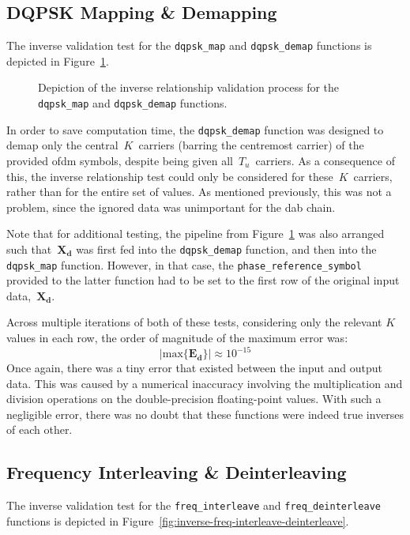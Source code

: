 \documentclass[class=report,11pt,crop=false]{standalone}
\begin{document}
\subsection{DQPSK Mapping \& Demapping}
The inverse validation test for the \texttt{dqpsk\_map} and \texttt{dqpsk\_demap} functions is depicted in Figure~\ref{fig:inverse-dqpsk-map-demap}.

\begin{figure}[htbp]
  \centering
  \captionsetup{type=figure}
  \def\svgwidth{0.95\linewidth}
  { %
      }
  \caption{Depiction of the inverse relationship validation process for the \texttt{dqpsk\_map} and \texttt{dqpsk\_demap} functions.}
  \label{fig:inverse-dqpsk-map-demap}
\end{figure}

In order to save computation time, the \texttt{dqpsk\_demap} function was designed to demap only the central~\(K\)~carriers (barring the centremost carrier) of the provided \gls{ofdm} symbols, despite being given all~\(T_u\)~carriers. As a consequence of this, the inverse relationship test could only be considered for these~\(K\)~carriers, rather than for the entire set of values. As mentioned previously, this was not a problem, since the ignored data was unimportant for the \gls{dab} chain.

Note that for additional testing, the pipeline from Figure~\ref{fig:inverse-dqpsk-map-demap} was also arranged such that~\(\mathbf{X_d}\) was first fed into the \texttt{dqpsk\_demap} function, and then into the \texttt{dqpsk\_map} function. However, in that case, the \texttt{phase\_reference\_symbol} provided to the latter function had to be set to the first row of the original input data,~\(\mathbf{X_d}\).

Across multiple iterations of both of these tests, considering only the relevant \(K\) values in each row, the order of magnitude of the maximum error was:
\begin{equation}
  \left| \mathrm{max} \{ \mathbf{E_d} \} \right| \approx 10^{-15}
\end{equation}
Once again, there was a tiny error that existed between the input and output data. This was caused by a numerical inaccuracy involving the multiplication and division operations on the double-precision floating-point values. With such a negligible error, there was no doubt that these functions were indeed true inverses of each other.

\subsection{Frequency Interleaving \& Deinterleaving}
The inverse validation test for the \texttt{freq\_interleave} and \texttt{freq\_deinterleave} functions is depicted in Figure~\ref{fig:inverse-freq-interleave-deinterleave}.
\end{document}

